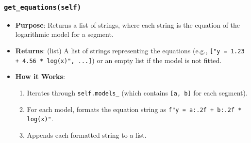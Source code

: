 \documentclass[12pt,a4paper]{report}
\begin{document}
{\subsubsection{\texttt{get\_equations(self)}}
\begin{itemize}
    \item \textbf{Purpose}: Returns a list of strings, where each string is the equation of the logarithmic model for a segment.
    \item \textbf{Returns}: (list) A list of strings representing the equations (e.g., \texttt{["y = 1.23 + 4.56 * log(x)", ...]}) or an empty list if the model is not fitted.
    \item \textbf{How it Works}:
        \begin{enumerate}
            \item Iterates through \texttt{self.models\_} (which contains \texttt{[a, b]} for each segment).
            \item For each model, formats the equation string as \texttt{f"y = {a:.2f} + {b:.2f} * log(x)"}.
            \item Appends each formatted string to a list.
        \end{enumerate}
\end{itemize}

}
\end{document}
